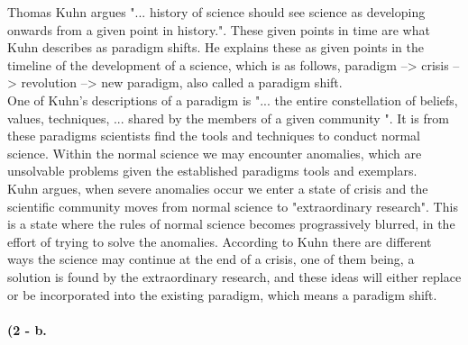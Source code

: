 \documentclass[paper=a4, fontsize=12pt]{scrartcl} %
\numberwithin{equation}{section} %
\numberwithin{figure}{section} %
\numberwithin{table}{section} %
\begin{document}
	Thomas Kuhn argues "... history of science should see science as developing onwards from a given point in history."\cite{KUHN20}. These given points in time are what Kuhn describes as paradigm shifts. He explains these as given points in the timeline of the development of a science, which is as follows, paradigm --> crisis --> revolution --> new paradigm, also called a paradigm shift\cite{KUHN20}. \\
	One of Kuhn’s descriptions of a paradigm is "... the entire constellation of beliefs, values, techniques, ... shared by the members of a given community "\cite{KUHN23}. It is from these paradigms scientists find the tools and techniques to conduct normal science\cite{KUHN21}. Within the normal science we may encounter anomalies, which are unsolvable problems given the established paradigms tools and exemplars\cite{KUHN25}.\\
    Kuhn argues, when severe anomalies occur we enter a state of crisis and the scientific community moves from normal science to "extraordinary research"\cite{KUHN27}. This is a state where the rules of normal science becomes prograssively blurred, in the effort of trying to solve the anomalies\cite{KUHN28}. 
	According to Kuhn there are different ways the science may continue at the end of a crisis\cite{KUHN29}, one of them being, a solution is found by the extraordinary research, and these ideas will either replace or be incorporated into the existing paradigm, which means a paradigm shift\cite{KUHN29}.

	\paragraph{(2 - b.}
\end{document}
